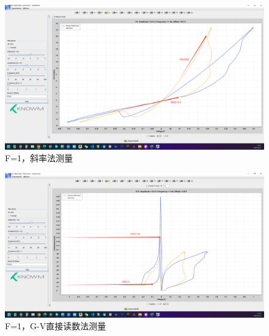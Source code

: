 \documentclass[12pt,hyperref,a4paper,UTF8]{ctexart}
\begin{document}
\begin{figure}[H]
    \centering
    \begin{minipage}{1\textwidth}
        \centering
        \includegraphics[width=1\textwidth]{figures/F11D.png}
        \caption{F=1，斜率法测量}
        \label{fig:system_block_diagram}
    \end{minipage}
\end{figure}


\begin{figure}[H]
    \centering
    \begin{minipage}{1\textwidth}
        \centering
        \includegraphics[width=1\textwidth]{figures/F12D.png}
        \caption{F=1，G-V直接读数法测量}
        \label{fig:system_block_diagram}
    \end{minipage}
\end{figure}
\end{document}
